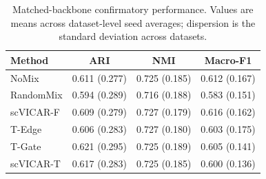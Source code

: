 \begin{table}[t]
\centering
\caption{Matched-backbone confirmatory performance. Values are means across dataset-level seed averages; dispersion is the standard deviation across datasets.}
\label{tab:confirmatory_overall}
\begin{tabular}{lccc}
\toprule
Method & ARI & NMI & Macro-F1 \\
\midrule
NoMix & 0.611 (0.277) & 0.725 (0.185) & 0.612 (0.167) \\
RandomMix & 0.594 (0.289) & 0.716 (0.188) & 0.583 (0.151) \\
scVICAR-F & 0.609 (0.279) & 0.727 (0.179) & 0.616 (0.162) \\
T-Edge & 0.606 (0.283) & 0.727 (0.180) & 0.603 (0.175) \\
T-Gate & 0.621 (0.295) & 0.725 (0.189) & 0.605 (0.141) \\
scVICAR-T & 0.617 (0.283) & 0.725 (0.185) & 0.600 (0.136) \\
\bottomrule
\end{tabular}
\end{table}
